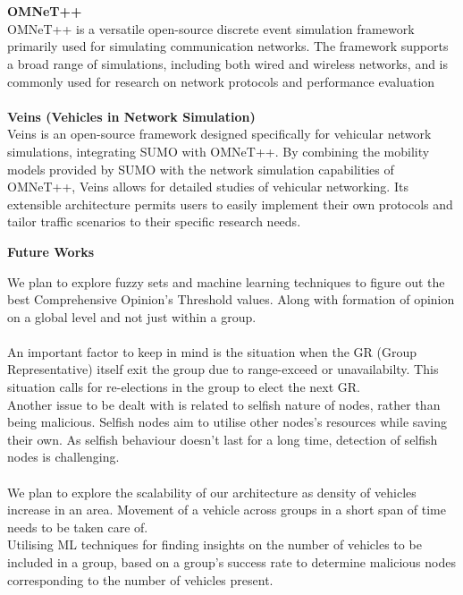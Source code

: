 \documentclass[a4paper,14pt]{extarticle}
\begin{document}
\\ \\ 
\textbf{OMNeT++} \\
OMNeT++ is a versatile open-source discrete event simulation framework primarily used for simulating communication networks. The framework supports a broad range of simulations, including both wired and wireless networks, and is commonly used for research on network protocols and performance evaluation 
\\ \\ 
\textbf{Veins (Vehicles in Network Simulation) }\\
Veins is an open-source framework designed specifically for vehicular network simulations, integrating SUMO with OMNeT++. By combining the mobility models provided by SUMO with the network simulation capabilities of OMNeT++, Veins allows for detailed studies of vehicular networking. Its extensible architecture permits users to easily implement their own protocols and tailor traffic scenarios to their specific research needs.

\newpage
\begin{center}
    {\LARGE \textbf{Future Works}} \\
    \vspace{1cm}
\end{center}
We plan to explore fuzzy sets and machine learning techniques to figure out the best Comprehensive Opinion's Threshold values. Along with formation of opinion on a global level and not just within a group.
\\ \\
An important factor to keep in mind is the situation when the GR (Group Representative) itself exit the group due to range-exceed or unavailabilty. This situation calls for re-elections in the group to elect the next GR.
\\
Another issue to be dealt with is related to selfish nature of nodes, rather than being malicious. Selfish nodes aim to utilise other nodes's resources while saving their own. As selfish behaviour doesn't last for a long time, detection of selfish nodes is challenging.
\\ \\ 
We plan to explore the scalability of our architecture as density of vehicles increase in an area. Movement of a vehicle across groups in a short span of time needs to be taken care of.
\\ Utilising ML techniques for finding insights on the number of vehicles to be included in a group, based on a group's success rate to determine malicious nodes corresponding to the number of vehicles present.
\end{document}
